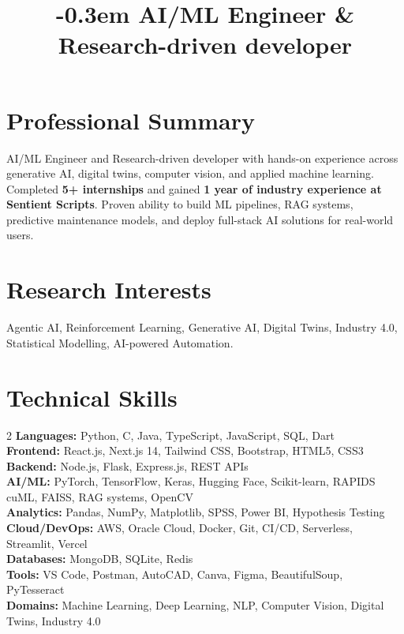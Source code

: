 \documentclass[11pt,a4paper]{moderncv}
\title{\kern-0.3em AI/ML Engineer \& Research-driven developer}
\begin{document}
\makecvtitle
\vspace{-1.2em}

\section{Professional Summary}
AI/ML Engineer and Research-driven developer with hands-on experience across generative AI, digital twins, computer vision, and applied machine learning. Completed \textbf{5+ internships} and gained \textbf{1 year of industry experience at Sentient Scripts}. Proven ability to build ML pipelines, RAG systems, predictive maintenance models, and deploy full-stack AI solutions for real-world users.

\section{Research Interests}
Agentic AI, Reinforcement Learning, Generative AI, Digital Twins, Industry 4.0, Statistical Modelling, AI-powered Automation.

\section{Technical Skills}
\begin{multicols}{2}
\textbf{Languages:} Python, C, Java, TypeScript, JavaScript, SQL, Dart\\
\textbf{Frontend:} React.js, Next.js 14, Tailwind CSS, Bootstrap, HTML5, CSS3\\
\textbf{Backend:} Node.js, Flask, Express.js, REST APIs\\
\textbf{AI/ML:} PyTorch, TensorFlow, Keras, Hugging Face, Scikit-learn, RAPIDS cuML, FAISS, RAG systems, OpenCV\\
\textbf{Analytics:} Pandas, NumPy, Matplotlib, SPSS, Power BI, Hypothesis Testing\\
\textbf{Cloud/DevOps:} AWS, Oracle Cloud, Docker, Git, CI/CD, Serverless, Streamlit, Vercel\\
\textbf{Databases:} MongoDB, SQLite, Redis\\
\textbf{Tools:} VS Code, Postman, AutoCAD, Canva, Figma, BeautifulSoup, PyTesseract\\
\textbf{Domains:} Machine Learning, Deep Learning, NLP, Computer Vision, Digital Twins, Industry 4.0
\end{multicols}
\end{document}
